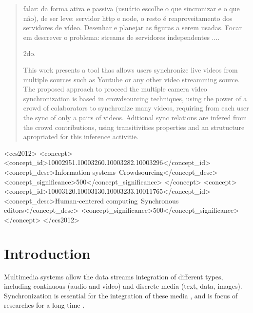 \documentclass{sig-alternate-05-2015}
\begin{document}
\maketitle
\begin{abstract}
	falar: da forma ativa e passiva (usuário escolhe o que sincronizar e o que não), de ser leve: servidor http e node, o resto é reaproveitamento dos servidores de vídeo. Desenhar e planejar as figuras a serem usadas.
	Focar em descrever o problema: streams de servidores independentes ....

	2do.
	
	
	
This work presents a tool thas allows users synchronize live videos from multiple sources such as Youtube or any other video streamming source. The proposed approach to proceed the multiple camera video synchronization is based in crowdsourcing techniques, using the power of a crowd of colaborators to synchronize many videos, requiring from each user the sync of only a pairs of videos. Aditional sync relations are infered from the crowd contributions, using transitivities properties and an strutucture apropriated for this inference activitie.  
	
	
	
\end{abstract}


%
%
 \begin{CCSXML}
<ccs2012>
	<concept>
		<concept_id>10002951.10003260.10003282.10003296</concept_id>
		<concept_desc>Information systems~Crowdsourcing</concept_desc>
		<concept_significance>500</concept_significance>
	</concept>
	<concept>
		<concept_id>10003120.10003130.10003233.10011765</concept_id>
		<concept_desc>Human-centered computing~Synchronous editors</concept_desc>
		<concept_significance>500</concept_significance>
	</concept>
</ccs2012>
\end{CCSXML}


\printccsdesc


\section{Introduction}
Multimedia systems allow the data streams integration of different types, including continuous (audio and video) and discrete media (text, data, images). Synchronization is essential for the integration of these media \cite{cesar2011past}, and is focus of researches for a long time \cite{malhotra2013hybrid, baba2012seamless}.
\end{document}
